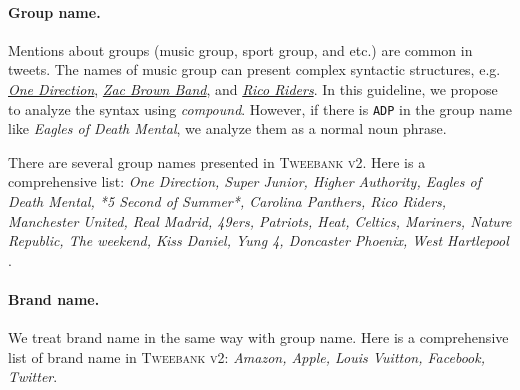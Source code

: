 \documentclass[11pt,a4paper]{article}
\begin{document}
\paragraph{Group name.}
Mentions about groups (music group, sport group, and etc.) are common in tweets.
The names of music group can present complex syntactic structures,
e.g. \underline{\textit{One Direction}}, \underline{\textit{Zac Brown Band}},
and \underline{\textit{Rico Riders}}.
In this guideline, we propose to analyze the syntax using \textit{compound}.
However, if there is \texttt{ADP} in the group name like \textit{Eagles of Death Mental}, we analyze them as a normal noun phrase.

There are several group names presented in \textsc{Tweebank v2}. Here is a comprehensive list:
\textit{One Direction, Super Junior, 
	Higher Authority,
	Eagles of Death Mental, 
	*5 Second of Summer*,
	Carolina Panthers, Rico Riders, Manchester United, Real Madrid,
	49ers, Patriots, Heat, Celtics,
	Mariners,
	Nature Republic,
	The weekend,
	Kiss Daniel,
	Yung 4,
	Doncaster Phoenix,
	West Hartlepool
}.

\paragraph{Brand name.}
We treat brand name in the same way with group name.
Here is a comprehensive list of brand name in \textsc{Tweebank v2}:
\textit{Amazon, Apple, Louis Vuitton, Facebook, Twitter}.
\end{document}
